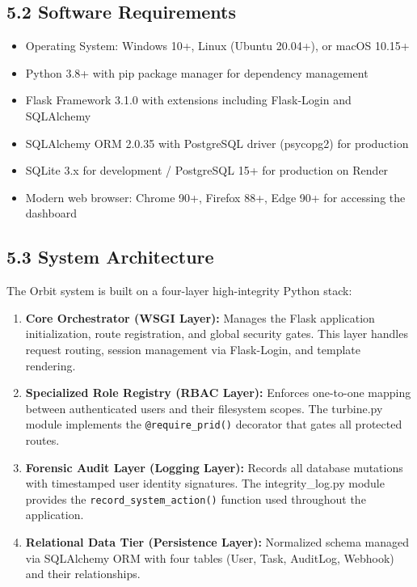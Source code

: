﻿\documentclass[12pt]{article}
\begin{document}
\subsection*{5.2 Software Requirements}
\begin{itemize}
\item Operating System: Windows 10+, Linux (Ubuntu 20.04+), or macOS 10.15+
\item Python 3.8+ with pip package manager for dependency management
\item Flask Framework 3.1.0 with extensions including Flask-Login and SQLAlchemy
\item SQLAlchemy ORM 2.0.35 with PostgreSQL driver (psycopg2) for production
\item SQLite 3.x for development / PostgreSQL 15+ for production on Render
\item Modern web browser: Chrome 90+, Firefox 88+, Edge 90+ for accessing the dashboard
\end{itemize}

\subsection*{5.3 System Architecture}
The Orbit system is built on a four-layer high-integrity Python stack:
\begin{enumerate}
\item \textbf{Core Orchestrator (WSGI Layer):} Manages the Flask application initialization, route registration, and global security gates. This layer handles request routing, session management via Flask-Login, and template rendering.
\item \textbf{Specialized Role Registry (RBAC Layer):} Enforces one-to-one mapping between authenticated users and their filesystem scopes. The turbine.py module implements the \texttt{@require\_prid()} decorator that gates all protected routes.
\item \textbf{Forensic Audit Layer (Logging Layer):} Records all database mutations with timestamped user identity signatures. The integrity\_log.py module provides the \texttt{record\_system\_action()} function used throughout the application.
\item \textbf{Relational Data Tier (Persistence Layer):} Normalized schema managed via SQLAlchemy ORM with four tables (User, Task, AuditLog, Webhook) and their relationships.
\end{enumerate}
\end{document}
